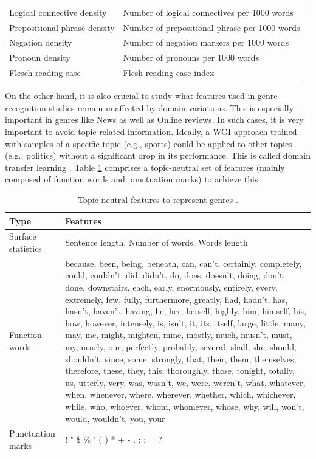 \begin{table}[t]
\begin{tabular}{p{4cm}p{8cm}}
        Logical connective density & Number of logical connectives per 1000 words \\
        Prepositional phrase density & Number of prepositional phrase per 1000 words \\
        Negation density & Number of negation markers per 1000 words \\
        Pronoun density & Number of pronouns per 1000 words \\
        Flesch reading-ease & Flesh reading-ease index \\
        \hline
	\end{tabular}
\end{table}

On the other hand, it is also crucial to study what features used in genre recognition studies remain unaffected by domain variations. This is especially important in genres like News as well as Online reviews. In such cases, it is very important to avoid topic-related information. Ideally, a WGI approach trained with samples of a specific topic (e.g., sports) could be applied to other topics (e.g., politics) without a significant drop in its performance. This is called {domain transfer} learning \parencite{finn2006learning}. Table \ref{chap:relevant_work:tbl:domain_trans_text_statistics} comprises a topic-neutral set of features (mainly composed of function words and punctuation marks) to achieve this. 

\begin{table}[t]
	\center
	\caption {Topic-neutral features to represent genres \parencite{finn2006learning}.}\label{chap:relevant_work:tbl:domain_trans_text_statistics}
	\begin{tabular}{p{3cm}p{10cm}}
		\hline
		Type & Features\\
		\hline
		 Surface statistics & Sentence length, Number of words, Words length \\
         Function words & because, been, being, beneath, can, can’t, certainly, completely, could, couldn’t, did, didn’t, do, does, doesn’t, doing, don’t, done, downstairs, each, early, enormously, entirely, every, extremely, few, fully, furthermore, greatly, had, hadn’t, has, hasn’t, haven’t, having, he, her, herself, highly, him, himself, his, how, however, intensely, is, isn’t, it, its, itself, large, little, many, may, me, might, mighten, mine, mostly, much, musn’t, must, my, nearly, our, perfectly, probably, several, shall, she, should, shouldn’t, since, some, strongly, that, their, them, themselves, therefore, these, they, this, thoroughly, those, tonight, totally, us, utterly, very, was, wasn’t, we, were, weren’t, what, whatever, when, whenever, where, wherever, whether, which, whichever, while, who, whoever, whom, whomever, whose, why, will, won’t, would, wouldn’t, you, your \\
         Punctuation marks  & ! " \$ \% ' ( ) * + - . : ; = ? \\
  		\hline
	\end{tabular}
\end{table}

